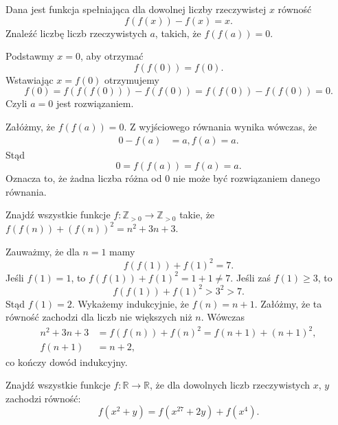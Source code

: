\newpage
{}

\begin{problem}{1}
	Dana jest funkcja spełniająca dla dowolnej liczby rzeczywistej $x$ równość
	\[
		f(f(x)) - f(x) = x.
	\]
	Znaleźć liczbę liczb rzeczywistych $a$, takich, że $f(f(a)) = 0$.
\end{problem}


\noindent
Podstawmy $x = 0$, aby otrzymać
\[
	f(f(0)) = f(0).
\]
Wstawiając $x = f(0)$ otrzymujemy
\[
	f(0) = f(f(f(0))) - f(f(0)) = f(f(0)) - f(f(0)) = 0.
\]
Czyli $a = 0$ jest rozwiązaniem.

\vspace{10px}

\noindent
Załóżmy, że $f(f(a)) = 0$. Z wyjściowego równania wynika wówczas, że
\begin{align*}
	0 - f(a) &= a,
	f(a) = a.
\end{align*}
Stąd
\[
	0 = f(f(a)) = f(a) = a.
\]
Oznacza to, że żadna liczba różna od $0$ nie może być rozwiązaniem danego równania.

\begin{problem}{2}
	Znajdź wszystkie funkcje  $ f: \mathbb{Z}_{>0} \to \mathbb{Z}_{>0}$ takie, że  $f(f(n)) + (f(n))^2 = n^2 + 3n + 3$.
\end{problem}


\noindent
Zauważmy, że dla $n = 1$ mamy
\[
	f(f(1)) + f(1)^2 = 7.
\]
Jeśli $f(1) = 1$, to $f(f(1)) + f(1)^2 = 1 + 1 \neq 7$. Jeśli zaś $f(1) \geqslant 3$, to
\[
	f(f(1)) + f(1)^2 > 3^2 > 7.
\]
Stąd $f(1) = 2$. Wykażemy indukcyjnie, że $f(n) = n + 1$. Załóżmy, że ta równość zachodzi dla liczb nie większych niż $n$. Wówczas
\begin{align*}
	n^2 + 3n + 3 &= f(f(n)) + f(n)^2 = f(n + 1) + (n + 1)^2, \\
	f(n + 1) &= n + 2,
\end{align*}
co kończy dowód indukcyjny. 

\begin{problem}{3}
	Znajdź wszystkie funkcje $f:\mathbb{R} \to \mathbb{R}$, że dla dowolnych liczb rzeczywistych $x$, $y$ zachodzi równość:
	\[
		f(x^2 + y) = f(x^{27} + 2y) + f(x^4).
	\]
\end{problem}


